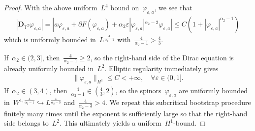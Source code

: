 \documentclass[10pt,a4paper]{amsart}
\newcommand{\p}{\partial}
\newcommand{\T}{\mathbb{T}}
\newcommand{\eps}{\varepsilon}
\newcommand{\pD}{\mathbf{D}}
\newcommand{\parenthesis}[1]{\left(#1\right)} %
\begin{document}
\begin{proof}
With the above uniform~$L^4$ bound on~$\varphi_{\eps,a}$, we see that 
    \begin{align}
        |\pD_{\T^2}\varphi_{\eps,a}|
        =|a\varphi_{\eps,a} + \p F(\varphi_{\eps,a})+ \alpha_2\eps|\varphi_{\eps,a}|^{\alpha_2-2}\varphi_{\eps,a} |
        \leq
        C\parenthesis{ 1+ |\varphi_{\eps,a}|^{\alpha_2 -1}}
    \end{align}
    which is uniformly bounded in~$L^{\frac{4}{\alpha_2 -1 }}$ with~$\frac{4}{\alpha_2 -1}>\frac{4}{3}$.

    If~$\alpha_2\in (2,3]$, then~$\frac{4}{\alpha_2-1}\geq 2$, so the right-hand side of the Dirac equation is already uniformly bounded in~$L^2$. 
    Elliptic regularity immediately gives
    \begin{align}
        \|\varphi_{\eps,a}\|_{H^1}\leq C<+\infty, \quad \forall \eps\in (0,1].
    \end{align}
    If~$\alpha_2\in (3,4)$, then~$\frac{4}{\alpha_2-1}\in (\frac{4}{3},2)$, so the spinors~$\varphi_{\eps,a} $ are uniformly bounded in~$W^{1,\frac{4}{\alpha_2-1}} \hookrightarrow L^{\frac{4}{\alpha_2-3}}$ and~$\frac{4}{\alpha_2-3}>4$.
    We repeat this subcritical bootstrap procedure finitely many times until the exponent is sufficiently large so that the right-hand side belongs to~$L^2$. This ultimately yields a uniform~$H^1$-bound.

\end{proof}
\end{document}
